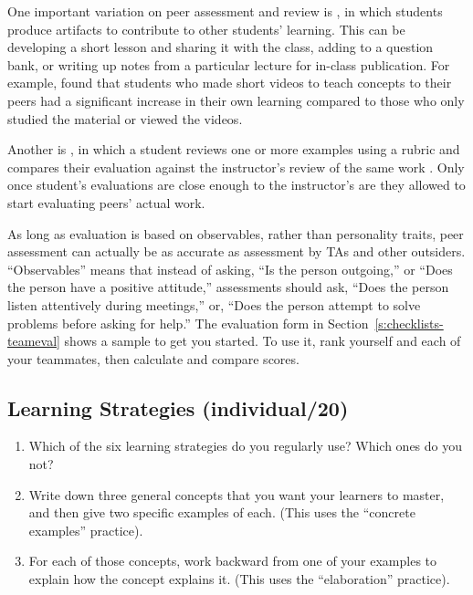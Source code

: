 One important variation on peer assessment and review is , in which students produce
artifacts to contribute to other students' learning. This can be
developing a short lesson and sharing it with the class, adding to a
question bank, or writing up notes from a particular lecture for
in-class publication. For example, \cite{Fran2018} found that
students who made short videos to teach concepts to their peers had a
significant increase in their own learning compared to those who only
studied the material or viewed the videos.

Another is , in
which a student reviews one or more examples using a rubric and
compares their evaluation against the instructor's review of the same
work \cite{Kulk2013}. Only once student's evaluations are close
enough to the instructor's are they allowed to start evaluating peers'
actual work.

As long as evaluation is based on observables, rather than personality
traits, peer assessment can actually be as accurate as assessment by TAs
and other outsiders. ``Observables'' means that instead of asking, ``Is the
person outgoing,'' or ``Does the person have a positive attitude,''
assessments should ask, ``Does the person listen attentively during
meetings,'' or, ``Does the person attempt to solve problems before asking
for help.'' The evaluation form in Section~\ref{s:checklists-teameval} shows a
sample to get you started. To use it, rank yourself and each of your
teammates, then calculate and compare scores.


\subsection*{Learning Strategies (individual/20)}

\begin{enumerate}
\item
  Which of the six learning strategies do you regularly use? Which
  ones do you not?
\item
  Write down three general concepts that you want your learners to
  master, and then give two specific examples of each. (This uses the
  ``concrete examples'' practice).
\item
  For each of those concepts, work backward from one of your examples
  to explain how the concept explains it. (This uses the ``elaboration''
  practice).
\end{enumerate}


